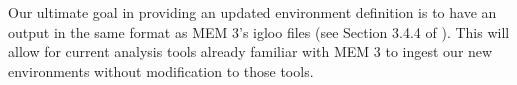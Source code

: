 \documentclass{hitec}
\begin{document}
Our ultimate goal in providing an updated environment definition is to have an output in the same format as MEM 3's igloo files (see Section 3.4.4 of \cite{moorhead2019nasa}). This will allow for current analysis tools already familiar with MEM 3 to ingest our new environments without modification to those tools. 


\cleardoublepage
{}
{}


\end{document}
